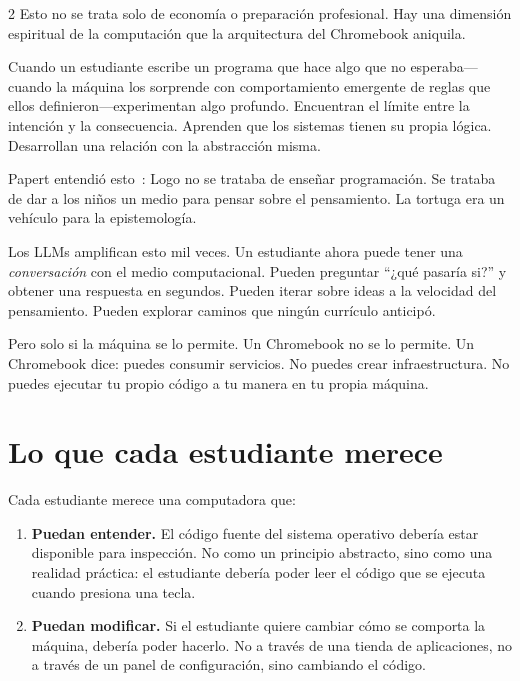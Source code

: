\documentclass[11pt, a4paper]{article}
\begin{document}
\begin{multicols}{2}
Esto no se trata solo de economía o preparación profesional. Hay una dimensión espiritual de la computación que la arquitectura del Chromebook aniquila.

Cuando un estudiante escribe un programa que hace algo que no esperaba---cuando la máquina los sorprende con comportamiento emergente de reglas que ellos definieron---experimentan algo profundo. Encuentran el límite entre la intención y la consecuencia. Aprenden que los sistemas tienen su propia lógica. Desarrollan una relación con la abstracción misma.

Papert entendió esto~\citep{papert1980mindstorms}: Logo no se trataba de enseñar programación. Se trataba de dar a los niños un medio para pensar sobre el pensamiento. La tortuga era un vehículo para la epistemología.

Los LLMs amplifican esto mil veces. Un estudiante ahora puede tener una \emph{conversación} con el medio computacional. Pueden preguntar ``¿qué pasaría si?'' y obtener una respuesta en segundos. Pueden iterar sobre ideas a la velocidad del pensamiento. Pueden explorar caminos que ningún currículo anticipó.

Pero solo si la máquina se lo permite. Un Chromebook no se lo permite. Un Chromebook dice: puedes consumir servicios. No puedes crear infraestructura. No puedes ejecutar tu propio código a tu manera en tu propia máquina.


\section{Lo que cada estudiante merece}

Cada estudiante merece una computadora que:

\begin{enumerate}
  \item \textbf{Puedan entender.} El código fuente del sistema operativo debería estar disponible para inspección. No como un principio abstracto, sino como una realidad práctica: el estudiante debería poder leer el código que se ejecuta cuando presiona una tecla.

  \item \textbf{Puedan modificar.} Si el estudiante quiere cambiar cómo se comporta la máquina, debería poder hacerlo. No a través de una tienda de aplicaciones, no a través de un panel de configuración, sino cambiando el código.


\end{enumerate}
\end{multicols}
\end{document}
